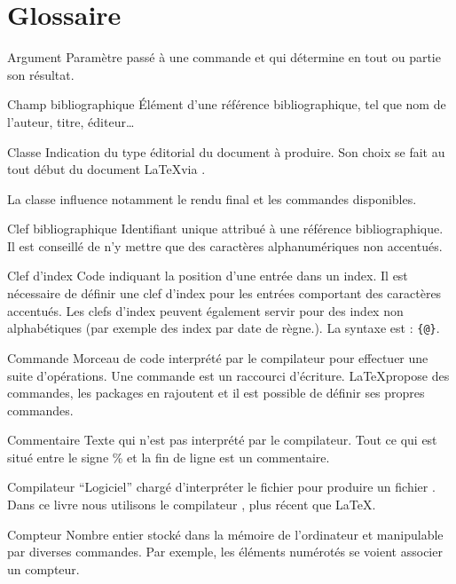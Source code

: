\chapter{Glossaire}


\begin{glossaire}
\item[Argument] Paramètre passé à une commande et qui détermine en tout ou partie son résultat.


\item[Champ bibliographique] Élément d'une référence bibliographique, tel que nom de l'auteur, titre, éditeur…


\item[Classe] Indication du type éditorial du document à produire. Son choix se fait au tout début du document \LaTeX via . 

La classe influence notamment le rendu final et les commandes disponibles.

\item[Clef bibliographique] Identifiant unique attribué à une référence bibliographique. Il est conseillé de n'y mettre que des caractères alphanumériques non accentués.

\item[Clef d'index] Code indiquant la position d'une entrée dans un index. Il est nécessaire de définir une clef d'index pour les entrées comportant des caractères accentués. Les clefs d'index peuvent également servir pour des index non alphabétiques (par exemple des index par date de règne.). La syntaxe est : \verb|{|\verb|@|\verb|}|.

\item[Commande] Morceau de code  interprété par le compilateur pour effectuer une suite d'opérations. Une commande est un raccourci d'écriture. \LaTeX propose des commandes, les packages en rajoutent et il est possible de définir ses propres commandes.

\item[Commentaire] Texte qui n'est pas interprété par le compilateur. Tout ce qui est situé entre le signe \% et la fin de ligne est un commentaire.

\item[Compilateur] \enquote{Logiciel} chargé d'interpréter le fichier  pour produire un fichier . Dans ce livre nous utilisons le compilateur \XeLaTeX, plus récent que \LaTeX.

\item[Compteur] Nombre entier stocké dans la mémoire de l'ordinateur et manipulable par diverses commandes. Par exemple, les éléments numérotés se voient associer un compteur.



\end{glossaire}
